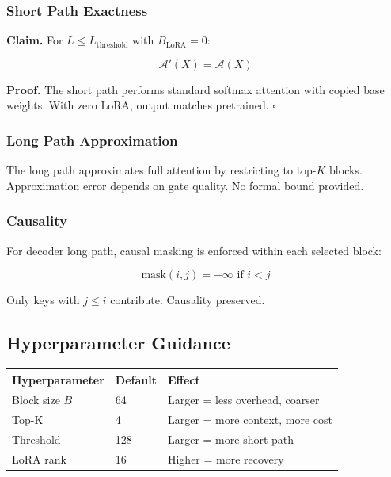 \subsubsection{Short Path Exactness}

\textbf{Claim.} For $L \leq L_\text{threshold}$ with $B_\text{LoRA} = 0$:

\[
\mathcal{A}'(X) = \mathcal{A}(X)
\tag{4.9}
\]

\textbf{Proof.} The short path performs standard softmax attention with copied 
base weights. With zero LoRA, output matches pretrained. $\square$

\subsubsection{Long Path Approximation}

The long path approximates full attention by restricting to top-$K$ blocks. 
Approximation error depends on gate quality. No formal bound provided.

\subsubsection{Causality}

For decoder long path, causal masking is enforced within each selected block:

\[
\text{mask}(i, j) = -\infty \text{ if } i < j
\tag{4.10}
\]

Only keys with $j \leq i$ contribute. Causality preserved.

\subsection{Hyperparameter Guidance}

\begin{table}[H]
\centering
\small
\begin{tabular}{lll}
\toprule
\textbf{Hyperparameter} & \textbf{Default} & \textbf{Effect} \\
\midrule
Block size $B$ & 64 & Larger = less overhead, coarser \\
Top-K & 4 & Larger = more context, more cost \\
Threshold & 128 & Larger = more short-path \\
LoRA rank & 16 & Higher = more recovery \\
\bottomrule
\end{tabular}
\end{table}

